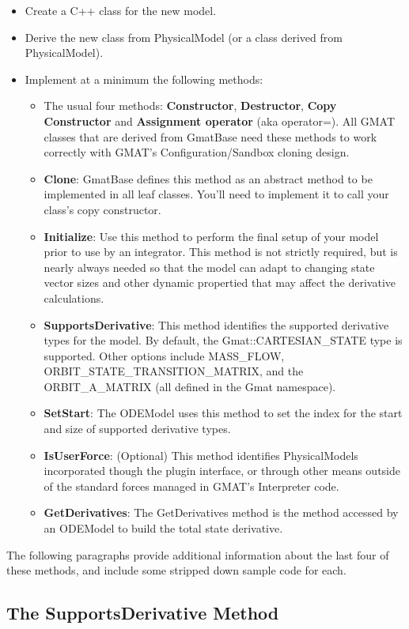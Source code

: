 \documentclass[letterpaper,10pt]{article}
\begin{document}
\begin{itemize}
\item Create a C++ class for the new model. 
\item Derive the new class from PhysicalModel (or a class derived from
PhysicalModel).
\item Implement at a minimum the following methods:
\begin{itemize}
\item The usual four methods: \textbf{Constructor}, \textbf{Destructor},
\textbf{Copy Constructor} and \textbf{Assignment operator} (aka operator=).  All
GMAT classes that are derived from GmatBase need these methods to work correctly
with GMAT's Configuration/Sandbox cloning design.
\item\textbf{Clone}:  GmatBase defines this method as an abstract method to be
implemented in all leaf classes.  You'll need to implement it to call your
class's copy constructor. 
\item \textbf{Initialize}:  Use this method to perform the final setup of your
model prior to use by an integrator.  This method is not strictly required, but
is nearly always needed so that the model can adapt to changing state vector
sizes and other dynamic propertied that may affect the derivative calculations.
\item \textbf{SupportsDerivative}:  This method identifies the supported
derivative types for the model.  By default, the Gmat::CARTESIAN\_STATE type is
supported.  Other options include MASS\_FLOW, ORBIT\_STATE\_TRANSITION\_MATRIX,
and the ORBIT\_A\_MATRIX (all defined in the Gmat namespace).
\item \textbf{SetStart}:  The ODEModel uses this method to set the index for the
start and size of supported derivative types. 
\item \textbf{IsUserForce}:  (Optional)  This method identifies PhysicalModels
incorporated though the plugin interface, or through other means outside of the
standard forces managed in GMAT's Interpreter code.
\item \textbf{GetDerivatives}:  The GetDerivatives method is the method accessed
by an ODEModel to build the total state derivative.
\end{itemize}
\end{itemize}

\noindent The following paragraphs provide additional information about the last
four of these methods, and include some stripped down sample code for each.

\subsection{The SupportsDerivative Method}
\end{document}
